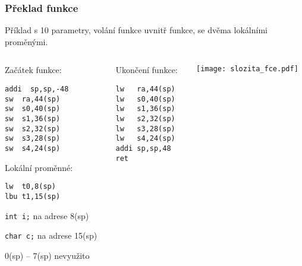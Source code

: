 \documentclass{beamer}
\begin{document}
\begin{frame}[fragile,shrink=5]
\frametitle{Překlad funkce}

Příklad s 10 parametry, volání funkce uvnitř funkce, se dvěma lokálními proměnými.

\begin{columns}
\begin{column}{0.35\textwidth}
Začátek funkce:

\begin{verbatim}
addi  sp,sp,-48
sw  ra,44(sp)
sw  s0,40(sp)
sw  s1,36(sp)
sw  s2,32(sp)
sw  s3,28(sp)
sw  s4,24(sp)
\end{verbatim}

Lokální proměnné:
\begin{verbatim}
lw  t0,8(sp)
lbu t1,15(sp)
\end{verbatim}

\texttt{int i;} na adrese 8(sp)

\texttt{char c;} na adrese 15(sp)

0(sp) -- 7(sp) nevyužito


\end{column}   
\begin{column}{0.29\textwidth}
Ukončení funkce:

\begin{verbatim}
lw   ra,44(sp)
lw   s0,40(sp)
lw   s1,36(sp)
lw   s2,32(sp)
lw   s3,28(sp)
lw   s4,24(sp)
addi sp,sp,48
ret
\end{verbatim}

\end{column}
\begin{column}{0.35\textwidth}  
\texttt{[image: slozita\_fce.pdf]}
\end{column}
\end{columns}
\end{frame}
\end{document}
